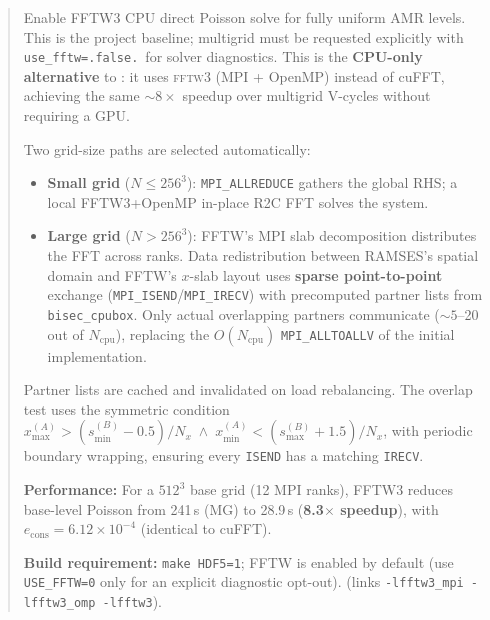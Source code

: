 \label{param:use_fftw}

\begin{quote}
Enable FFTW3 CPU direct Poisson solve for fully uniform AMR levels.
This is the project baseline; multigrid must be requested explicitly with
\texttt{use\_fftw=.false.}\ for solver diagnostics.
This is the \textbf{CPU-only alternative} to :
it uses \textsc{fftw3} (MPI + OpenMP) instead of cuFFT, achieving
the same ${\sim}8\times$ speedup over multigrid V-cycles without
requiring a GPU.

Two grid-size paths are selected automatically:
\begin{itemize}[nosep]
  \item \textbf{Small grid} ($N \le 256^3$): \texttt{MPI\_ALLREDUCE}
        gathers the global RHS; a local FFTW3+OpenMP in-place R2C
        FFT solves the system.
  \item \textbf{Large grid} ($N > 256^3$): FFTW's MPI slab
        decomposition distributes the FFT across ranks.  Data
        redistribution between RAMSES's spatial domain and FFTW's
        $x$-slab layout uses \textbf{sparse point-to-point} exchange
        (\texttt{MPI\_ISEND}/\texttt{MPI\_IRECV}) with precomputed
        partner lists from \texttt{bisec\_cpubox}.  Only actual
        overlapping partners communicate (${\sim}5$--20 out of
        $N_{\text{cpu}}$), replacing the $O(N_{\text{cpu}})$
        \texttt{MPI\_ALLTOALLV} of the initial implementation.
\end{itemize}

Partner lists are cached and invalidated on load rebalancing.  The
overlap test uses the symmetric condition
$x_{\max}^{(A)} > (s_{\min}^{(B)} - 0.5) / N_x \;\wedge\;
x_{\min}^{(A)} < (s_{\max}^{(B)} + 1.5) / N_x$,
with periodic boundary wrapping, ensuring every \texttt{ISEND} has a
matching \texttt{IRECV}.

\textbf{Performance:} For a $512^3$ base grid (12 MPI ranks),
FFTW3 reduces base-level Poisson from 241\,s (MG) to 28.9\,s
(\textbf{8.3$\times$ speedup}), with $e_{\text{cons}} = 6.12 \times
10^{-4}$ (identical to cuFFT).

\textbf{Build requirement:} \texttt{make HDF5=1}; FFTW is enabled by default
(use \texttt{USE\_FFTW=0} only for an explicit diagnostic opt-out).
(links \texttt{-lfftw3\_mpi -lfftw3\_omp -lfftw3}).

\end{quote}

